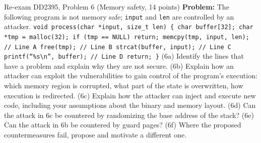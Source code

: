 \documentclass[12pt, a4paper]{article}
\begin{document}
\begin{practicebox}{Re-exam DD2395, Problem 6 (Memory safety, 14 points)}
\textbf{Problem:} The following program is not memory safe; \texttt{input} and \texttt{len} are controlled by an attacker. \texttt{void process(char *input, size\_t len) \{ char buffer[32]; char *tmp = malloc(32); if (tmp == NULL) return; memcpy(tmp, input, len); // Line A free(tmp); // Line B strcat(buffer, input); // Line C printf(``\%s\textbackslash n'', buffer); // Line D return; \}} (6a) Identify the lines that have a problem and explain why they are not secure. (6b) Explain how an attacker can exploit the vulnerabilities to gain control of the program's execution: which memory region is corrupted, what part of the state is overwritten, how execution is redirected. (6c) Explain how the attacker can inject and execute new code, including your assumptions about the binary and memory layout. (6d) Can the attack in 6c be countered by randomizing the base address of the stack? (6e) Can the attack in 6b be countered by guard pages? (6f) Where the proposed countermeasures fail, propose and motivate a different one.


\end{practicebox}
\end{document}
